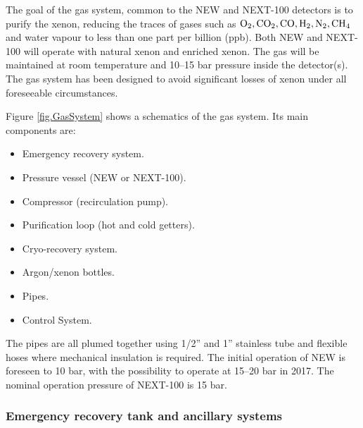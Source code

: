 The goal of the gas system, common to the NEW and NEXT-100 detectors is to purify the xenon, reducing the traces of gases such as ${\rm O_2, CO_2,CO, H_2, N_2, CH_4}$~ and water vapour to less than one part per billion (ppb). Both NEW and NEXT-100 will operate with natural xenon and enriched xenon. The gas will be maintained at room temperature and 10--15 bar pressure inside the detector(s). The gas system has been designed to avoid significant losses of xenon under all foreseeable circumstances.


Figure \ref{fig.GasSystem} shows a schematics of the gas system. Its main components are:  

\begin{itemize}
\item Emergency recovery system.
\item Pressure vessel (NEW or NEXT-100). 
\item Compressor (recirculation pump).
\item Purification loop (hot and cold getters).
\item Cryo-recovery system.
\item Argon/xenon bottles.
\item Pipes.
\item Control System.
\end{itemize}

The pipes are all plumed together using 1/2'' and 1'' stainless tube and flexible hoses where mechanical insulation is required. The initial operation of NEW is foreseen to 10 bar, with the possibility to operate at 15--20 bar in 2017. The nominal operation pressure of NEXT-100 is 15 bar. 

\subsubsection*{Emergency recovery tank and ancillary systems}

